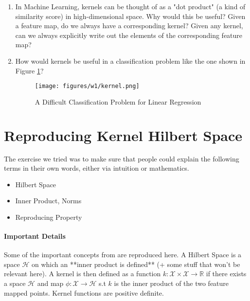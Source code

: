 \documentclass[12pt]{article}
\begin{document}
\begin{enumerate}
    \item In Machine Learning, kernels can be thought of as a "dot product" (a kind of similarity score) in high-dimensional space. Why would this be useful? Given a feature map, do we always have a corresponding kernel? Given any kernel, can we always explicitly write out the elements of the corresponding feature map?

    \item How would kernels be useful in a classification problem like the one shown in Figure \ref{fig:kernel-classification}? 
    \begin{figure}[h!]
        \centering
        \texttt{[image: figures/w1/kernel.png]}
        \caption{A Difficult Classification Problem for Linear Regression}
        \label{fig:kernel-classification}
    \end{figure}
    
\end{enumerate}

\section{Reproducing Kernel Hilbert Space}

The exercise we tried was to make sure that people could explain the following terms in their own words, either via intuition or mathematics.

\begin{itemize}
    \item Hilbert Space
    \item Inner Product, Norms
    \item Reproducing Property
\end{itemize}

\paragraph{Important Details} Some of the important concepts from \cite{Gretton15introductionto} are reproduced here. A Hilbert Space is a space $\mathcal{H}$ on which an **inner product is defined** (+ some stuff that won't be relevant here). A kernel is then defined as a function $k: \mathcal{X} \times \mathcal{X} \rightarrow \mathbb{R}$ if there exists a space $\mathcal{H}$ and map $\phi: \mathcal{X} \rightarrow \mathcal{H}$ s.t $k$ is the inner product of the two feature mapped points. Kernel functions are positive definite.
\end{document}

